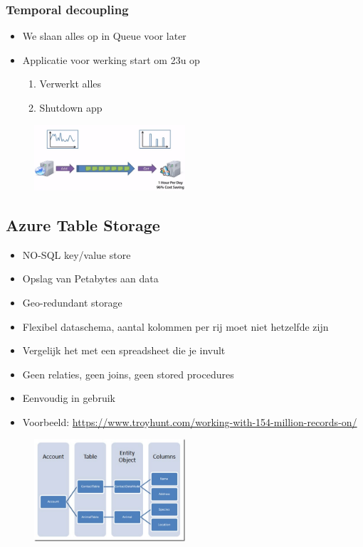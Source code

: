 \documentclass{article}
\begin{document}
\subsubsection{Temporal decoupling}

\begin{itemize}
    \item We slaan alles op in Queue voor later
    \item Applicatie voor werking start om 23u op
    \begin{enumerate}
        \item Verwerkt alles
        \item Shutdown app
    \end{enumerate}
\end{itemize}

\begin{figure}[H]
    \centering
    \includegraphics[width=0.5\textwidth]{temporal-decoupling.png}
    \caption{}
\end{figure}

\subsection{Azure Table Storage}

\begin{itemize}
    \item NO-SQL key/value store
    \item Opslag van Petabytes aan data
    \item Geo-redundant storage
    \item Flexibel dataschema, aantal kolommen per rij moet niet hetzelfde zijn
    \item Vergelijk het met een spreadsheet die je invult
    \item Geen relaties, geen joins, geen stored procedures
    \item Eenvoudig in gebruik
    \item Voorbeeld: \url{https://www.troyhunt.com/working-with-154-million-records-on/}
\end{itemize}

\begin{figure}[H]
    \centering
    \includegraphics[width=0.5\textwidth]{azure-storage-table.png}
    \caption{}
\end{figure}
\end{document}

